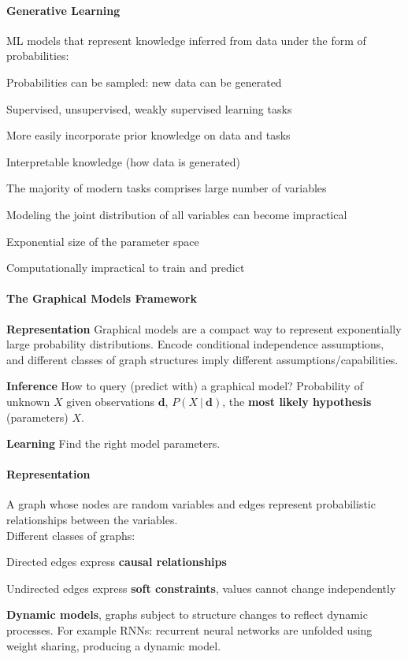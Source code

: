 \documentclass[10pt]{report}
\begin{document}
\paragraph{Generative Learning} ML models that represent knowledge inferred from data under the form of probabilities:
\begin{list}{}{}
	\item Probabilities can be sampled: new data can be generated
	\item Supervised, unsupervised, weakly supervised learning tasks
	\item More easily incorporate prior knowledge on data and tasks
	\item Interpretable knowledge (how data is generated)
\end{list}
The majority of modern tasks comprises large number of variables\begin{list}{}{}
	\item Modeling the joint distribution of all variables can become impractical
	\item Exponential size of the parameter space
	\item Computationally impractical to train and predict
\end{list}
\paragraph{The Graphical Models Framework}
\begin{list}{}{}
	\item \textbf{Representation} Graphical models are a compact way to represent exponentially large probability distributions. Encode conditional independence assumptions, and different classes of graph structures imply different assumptions/capabilities.
	\item \textbf{Inference} How to query (predict with) a graphical model? Probability of unknown $X$ given observations $\mathbf{d}$, $P(X\:|\:\mathbf{d})$, the \textbf{most likely hypothesis} (parameters) $X$.
	\item \textbf{Learning} Find the right model parameters.
\end{list}
\paragraph{Representation} A graph whose nodes are random variables and edges represent probabilistic relationships between the variables.\\
Different classes of graphs:
\begin{list}{}{}
	\item Directed edges express \textbf{causal relationships}
	\item Undirected edges express \textbf{soft constraints}, values cannot change independently
	\item \textbf{Dynamic models}, graphs subject to structure changes to reflect dynamic processes. For example RNNs: recurrent neural networks are unfolded using weight sharing, producing a dynamic model.
\end{list}
\end{document}
